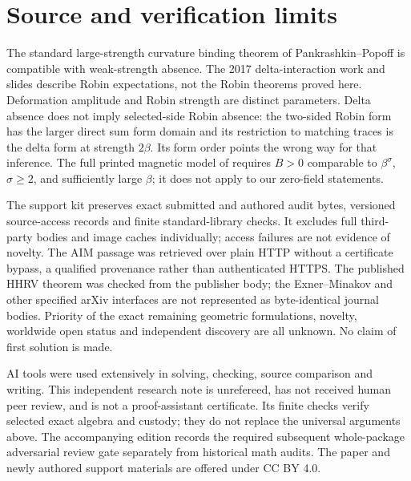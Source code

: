 \documentclass[11pt]{article}
\begin{document}
\section{Source and verification limits}
The standard large-strength curvature binding theorem of
Pankrashkin--Popoff \cite{PP} is compatible with weak-strength absence.
The 2017 delta-interaction work and slides \cite{EKL} describe Robin
expectations, not the Robin theorems proved here. Deformation amplitude and
Robin strength are distinct parameters. Delta absence does not imply
selected-side Robin absence: the two-sided Robin form has the larger direct
sum form domain and its restriction to matching traces is the delta form
at strength $2\beta$. Its form order points the wrong way for that inference.
The full printed magnetic model of \cite{BSZ} requires $B>0$ comparable to
$\beta^\sigma$, $\sigma\ge2$, and sufficiently large $\beta$; it does not
apply to our zero-field statements.

The support kit preserves exact submitted and authored audit bytes, versioned
source-access records and finite standard-library checks. It excludes full
third-party bodies and image caches individually; access failures are not
evidence of novelty. The AIM passage was retrieved over plain HTTP without a
certificate bypass, a qualified provenance rather than authenticated HTTPS.
The published HHRV theorem was checked from the publisher body; the
Exner--Minakov and other specified arXiv interfaces are not represented as
byte-identical journal bodies. Priority of the exact remaining geometric
formulations, novelty, worldwide open status and independent discovery are
all unknown. No claim of first solution is made.

AI tools were used extensively in solving, checking, source comparison and
writing. This independent research note is unrefereed, has not received human
peer review, and is not a proof-assistant certificate. Its finite checks
verify selected exact algebra and custody; they do not replace the universal
arguments above. The accompanying edition records the required subsequent
whole-package adversarial review gate separately from historical math audits.
The paper and newly authored support materials are offered under CC BY 4.0.
\end{document}
